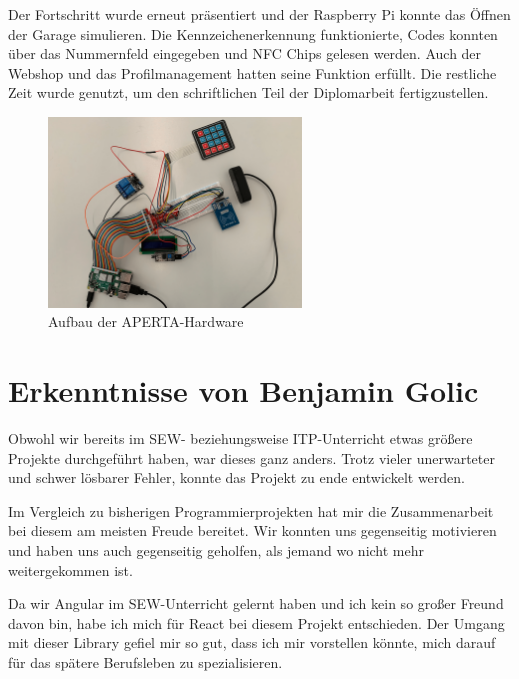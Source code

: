 Der Fortschritt wurde erneut präsentiert und der Raspberry Pi konnte das Öffnen der Garage simulieren. Die Kennzeichenerkennung funktionierte, Codes konnten über das Nummernfeld eingegeben und NFC Chips gelesen werden. Auch der Webshop und das Profilmanagement hatten seine Funktion erfüllt. Die restliche Zeit wurde genutzt, um den schriftlichen Teil der Diplomarbeit fertigzustellen. 

\begin{figure}[H]
    \centering
    \includegraphics[width=0.6\textwidth]{pics/Aufbau.png}
    \caption{Aufbau der APERTA-Hardware}
  \end{figure}


\section{Erkenntnisse von Benjamin Golic}
Obwohl wir bereits im SEW- beziehungsweise ITP-Unterricht etwas größere Projekte durchgeführt haben, war dieses ganz anders. Trotz vieler unerwarteter und schwer lösbarer Fehler, konnte das Projekt zu ende entwickelt werden. 

Im Vergleich zu bisherigen Programmierprojekten hat mir die Zusammenarbeit bei diesem am meisten Freude bereitet. Wir konnten uns gegenseitig motivieren und haben uns auch gegenseitig geholfen, als jemand wo nicht mehr weitergekommen ist. 

Da wir Angular im SEW-Unterricht gelernt haben und ich kein so großer Freund davon bin, habe ich mich für React bei diesem Projekt entschieden. Der Umgang mit dieser Library gefiel mir so gut, dass ich mir vorstellen könnte, mich darauf für das spätere Berufsleben zu spezialisieren. 

